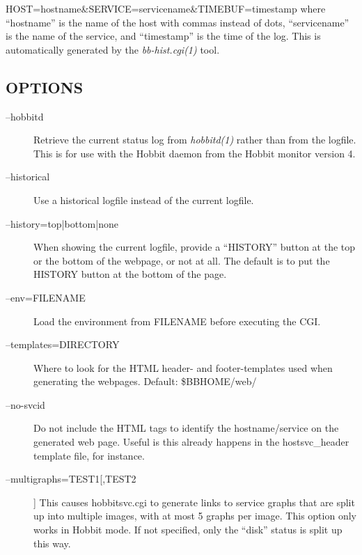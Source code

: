 HOST=hostname\&SERVICE=servicename\&TIMEBUF=timestamp  
 where ``hostname'' is the name of the host with commas instead of dots, ``servicename'' is the name of the service, and ``timestamp'' is the time of the log. This is automatically generated by the \emph{bb-hist.cgi(1)}
 tool. 



\subsection{OPTIONS}
\begin{description}
\item[--hobbitd] Retrieve the current status log from \emph{hobbitd(1)}
 rather than from the logfile. This is for use with the Hobbit daemon from the Hobbit monitor version 4. 

 

\item[--historical] Use a historical logfile instead of the current logfile. 

 

\item[--history={top|bottom|none}] When showing the current logfile, provide a ``HISTORY'' button at the top or the bottom of the webpage, or not at all. The default is to put the HISTORY button at the bottom of the page. 

 

\item[--env=FILENAME] Load the environment from FILENAME before executing the CGI. 

 

\item[--templates=DIRECTORY] Where to look for the HTML header- and footer-templates used when generating the webpages. Default: \$BBHOME/web/ 

 

\item[--no-svcid] Do not include the HTML tags to identify the hostname/service on the generated web page. Useful is this already happens in the hostsvc\_header template file, for instance. 

 

\item[--multigraphs=TEST1[,TEST2]] This causes hobbitsvc.cgi to generate links to service graphs that are split up into multiple images, with at most 5 graphs per image. This option only works in Hobbit mode. If not specified, only the ``disk'' status is split up this way. 


\end{description}
